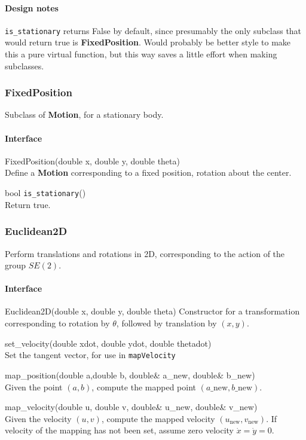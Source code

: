 \documentclass[11pt]{article}
\def\class#1{{\bf #1}} %
\def\fn#1{{\tt #1}} %
\begin{document}
\paragraph{Design notes}
\fn{is\_stationary} returns False by default, since presumably the only subclass that would return true is \class{FixedPosition}.  Would probably be better style to make this a pure virtual function, but this way saves a little effort when making subclasses.

\subsubsection{FixedPosition}
Subclass of \class{Motion}, for a stationary body.

\paragraph{Interface}
\begin{description}
	\item FixedPosition(double x, double y, double theta) \\
		Define a \class{Motion} corresponding to a fixed position, rotation about the center.
	\item bool \fn{is\_stationary}()\\
		Return true.
\end{description}
	

\subsubsection{Euclidean2D}
Perform translations and rotations in 2D, corresponding to the action of the group $SE(2)$.

\paragraph{Interface}
\begin{description}
	\item Euclidean2D(double x, double y, double theta)
		Constructor for a transformation corresponding to rotation by $\theta$, followed by translation by $(x,y)$.
	\item set\_velocity(double xdot, double ydot, double thetadot) \\
		Set the tangent vector, for use in \fn{mapVelocity}
	\item map\_position(double a,double b, double\& a\_new, double\& b\_new)\\
		Given the point $(a,b)$, compute the mapped point $(a\_\text{new},b\_\text{new})$.
	\item map\_velocity(double u, double v, double\& u\_new, double\& v\_new)\\
		Given the velocity $(u,v)$, compute the mapped velocity $(u_\text{new},v_\text{new})$.  If velocity of the mapping has not been set, assume zero velocity $\dot x = \dot y = 0$.
\end{description}
\end{document}
